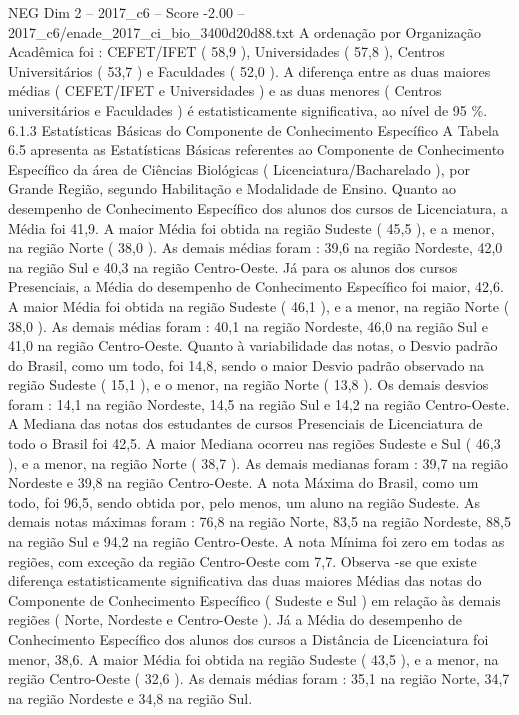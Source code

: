 \begin{textsample}{NEG Dim 2 – 2017\_c6 – Score -2.00 – 2017\_c6/enade\_2017\_ci\_bio\_3400d20d88.txt}
A ordenação por Organização Acadêmica foi : CEFET/IFET ( 58,9 ), Universidades ( 57,8 ), Centros Universitários ( 53,7 ) e Faculdades ( 52,0 ).
A diferença entre as duas maiores médias ( CEFET/IFET e Universidades ) e as duas menores ( Centros universitários e Faculdades ) é estatisticamente significativa, ao nível de 95 \%. 6.1.3 Estatísticas Básicas do Componente de Conhecimento Específico A Tabela 6.5 apresenta as Estatísticas Básicas referentes ao Componente de Conhecimento Específico da área de Ciências Biológicas ( Licenciatura/Bacharelado ), por Grande Região, segundo Habilitação e Modalidade de Ensino.
Quanto ao desempenho de Conhecimento Específico dos alunos dos cursos de Licenciatura, a Média foi 41,9.
A maior Média foi obtida na região Sudeste ( 45,5 ), e a menor, na região Norte ( 38,0 ).
As demais médias foram : 39,6 na região Nordeste, 42,0 na região Sul e 40,3 na região Centro-Oeste.
Já para os alunos dos cursos Presenciais, a Média do desempenho de Conhecimento Específico foi maior, 42,6.
A maior Média foi obtida na região Sudeste ( 46,1 ), e a menor, na região Norte ( 38,0 ).
As demais médias foram : 40,1 na região Nordeste, 46,0 na região Sul e 41,0 na região Centro-Oeste.
Quanto à variabilidade das notas, o Desvio padrão do Brasil, como um todo, foi 14,8, sendo o maior Desvio padrão observado na região Sudeste ( 15,1 ), e o menor, na região Norte ( 13,8 ).
Os demais desvios foram : 14,1 na região Nordeste, 14,5 na região Sul e 14,2 na região Centro-Oeste.
A Mediana das notas dos estudantes de cursos Presenciais de Licenciatura de todo o Brasil foi 42,5.
A maior Mediana ocorreu nas regiões Sudeste e Sul ( 46,3 ), e a menor, na região Norte ( 38,7 ).
As demais medianas foram : 39,7 na região Nordeste e 39,8 na região Centro-Oeste.
A nota Máxima do Brasil, como um todo, foi 96,5, sendo obtida por, pelo menos, um aluno na região Sudeste.
As demais notas máximas foram : 76,8 na região Norte, 83,5 na região Nordeste, 88,5 na região Sul e 94,2 na região Centro-Oeste.
A nota Mínima foi zero em todas as regiões, com exceção da região Centro-Oeste com 7,7.
Observa -se que existe diferença estatisticamente significativa das duas maiores Médias das notas do Componente de Conhecimento Específico ( Sudeste e Sul ) em relação às demais regiões ( Norte, Nordeste e Centro-Oeste ).
Já a Média do desempenho de Conhecimento Específico dos alunos dos cursos a Distância de Licenciatura foi menor, 38,6.
A maior Média foi obtida na região Sudeste ( 43,5 ), e a menor, na região Centro-Oeste ( 32,6 ).
As demais médias foram : 35,1 na região Norte, 34,7 na região Nordeste e 34,8 na região Sul.

\end{textsample}
